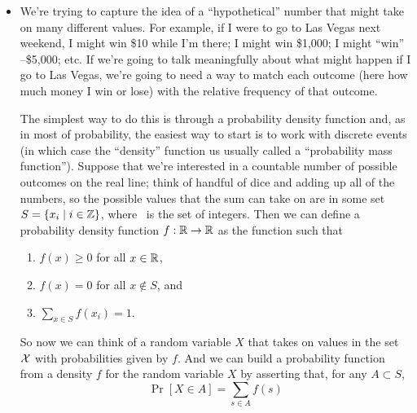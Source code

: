 \begin{itemize}

\item We're trying to capture the idea of a ``hypothetical'' number
  that might take on many different values.  For example, if I were to
  go to Las Vegas next weekend, I might win \$10 while I'm there; I
  might win \$1,000; I might ``win'' --\$5,000; etc.  If we're going
  to talk meaningfully about what might happen if I go to Las Vegas,
  we're going to need a way to match each outcome (here how much money
  I win or lose) with the relative frequency of that outcome.

  The simplest  way to do this is through a
  probability density function and, as in most of probability, the
  easiest way to start is to work with discrete events (in which case
  the ``density'' function us usually called a ``probability mass
  function'').  Suppose that we're interested in a countable number of
  possible outcomes on the real line; think of handful of dice and
  adding up all of the numbers, so the possible values that the sum
  can take on are in some set $S = \{x_i \mid i \in \mathbb{Z}\}$, where \ZZ\ is
  the set of integers.  Then we can define a probability density
  function $f: \mathbb{R} \to \mathbb{R}$ as the function such that
  \begin{enumerate}
  \item $f(x) \geq 0$ for all $x \in \mathbb{R}$,
  \item $f(x) = 0$ for all $x \notin S$, and
  \item $\sum_{x \in S} f(x_i) = 1$.
  \end{enumerate}

  So now we can think of a random variable $X$ that takes on values in
  the set $\mathcal{X}$ with probabilities given by $f$.  And we can
  build a probability function from a density $f$ for the random
  variable $X$ by asserting that, for any $A \subset S$,
  \begin{equation*}
    \Pr[ X \in A ] = \sum_{s \in A} f(s)
  \end{equation*}


\end{itemize}
